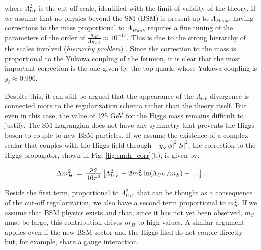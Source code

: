 where $\Lambda_{UV}^2$ is the cut-off scale, identified with the limit of validity of the theory. If we assume that no physics beyond the SM (BSM) is present up to $\Lambda_{Plank}$, having corrections to the mass proportional to $\Lambda_{Plank}$ requires a fine tuning of the parameters of the order of $\frac{m_H}{\Lambda_{Plank}} \approx 10^{-17}$. This is due to the strong hierarchy of the scales involved (\textit{hierarchy problem}) \cite{Weinberg:1975gm}\cite{PhysRevD.20.2619}\cite{PhysRevD.14.1667}\cite{tHooft:1979rat}. Since the correction to the mass is proportional to the Yukawa coupling of the fermion, it is clear that the most important correction is the one given by the top quark, whose Yukawa coupling is $y_t \approx 0.996$. 

Despite this, it can still be argued that the appearance of the $\Lambda_{UV}$ divergence is connected more to the regularization schema rather than the theory itself. But even in this case, the value of 125 GeV for the Higgs mass remains difficult to justify. The SM Lagrangian does not have any symmetry that prevents the Higgs boson to couple to new BSM particles. If we assume the existence of a complex scalar that couples with the Higgs field through $ -y_S|\phi|^2 |S|^2$, the correction to the Higgs propagator, shown in Fig. \ref{fig:sm:h_corr}(b), is given by:

\begin{equation}
\Delta m_H^2 \>=\> {y_S\over 16 \pi^2}
\left [\Lambda_{UV}^2 - 2 m_S^2
\> {\rm ln}(\Lambda_{UV}/m_S) + \ldots
\right ].
\label{eq:divhs}
\end{equation}

Beside the first term, proportional to $\Lambda_{UV}^2$, that can be thought as a consequence of the cut-off regularization, we also have a second  term proportional to $m_S^2$. If we assume that BSM physics exists and that, since it has not yet been observed, $m_S$ must be large, this contribution drives $m_H$ to high values. A similar argument applies even if the new BSM sector and the Higgs filed do not couple directly but, for example, share a gauge interaction.

